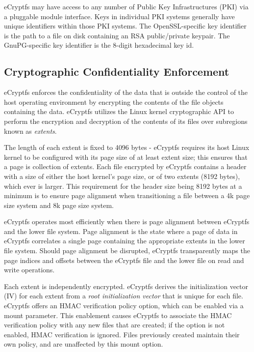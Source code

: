 \documentclass{article}
\begin{document}
eCryptfs may have access to any number of Public Key Infrastructures
(PKI) via a pluggable module interface. Keys in individual PKI systems
generally have unique identifiers within those PKI systems. The
OpenSSL-specific key identifier is the path to a file on
disk containing an RSA public/private keypair. The GnuPG-specific key
identifier is the 8-digit hexadecimal key id.

\subsection{Cryptographic Confidentiality Enforcement}

eCryptfs enforces the confidentiality of the data that is outside the
control of the host operating environment by encrypting the contents
of the file objects containing the data. eCryptfs utilizes the Linux
kernel cryptographic API to perform the encryption and decryption of
the contents of its files over subregions known as \emph{extents}.

The length of each extent is fixed to 4096 bytes - eCryptfs requires
its host Linux kernel to be configured with its page size of at least
extent size; this ensures that a page is collection of extents. Each file
encrypted by eCryptfs contains a header with a size of either
the host kernel's page size, or of two extents (8192 bytes), which
ever is larger. This requirement for the header size being 8192
bytes at a minimum is to ensure page alignment when transitioning
a file between a 4k page size system and 8k page size system.

eCryptfs operates most efficiently when there is page alignment between
eCryptfs and the lower file system. Page alignment is the state where
a page of data in eCryptfs correlates a single page containing the
appropriate extents in the lower file system. Should page alignment
be disrupted, eCryptfs transparently maps the page indices and offsets
between the eCryptfs file and the lower file on read and write operations.

Each extent is independently encrypted. eCryptfs derives the
initialization vector (IV) for each extent from a \emph{root
initialization vector} that is unique for each file. eCryptfs offers
an HMAC verification policy option, which can be enabled via a mount
parameter. This enablement causes eCryptfs to associate the HMAC
verification policy with any new files that are created; if the option
is not enabled, HMAC verification is ignored. Files previously created
maintain their own policy, and are unaffected by this mount option.
\end{document}
